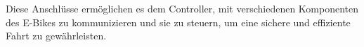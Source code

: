 Diese Anschlüsse ermöglichen es dem Controller, mit verschiedenen Komponenten des E-Bikes zu kommunizieren und sie zu steuern, um eine sichere und effiziente Fahrt zu gewährleisten.

